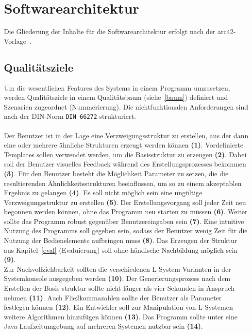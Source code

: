 \section{Softwarearchitektur}
Die Gliederung der Inhalte für die Softwarearchitektur erfolgt nach der arc42-Vorlage~\cite{arc42}.

\subsection*{Qualitätsziele}
Um die wesentlichen Features des Systems in einem Programm umzusetzen, werden Qualitätsziele in einem Qualitätsbaum
(siehe~\ref{baum}) definiert und Szenarien zugeordnet (Nummerierung).
Die nichtfunktionalen Anforderungen sind nach der DIN-Norm \texttt{DIN 66272} strukturiert.\\~\\
Der Benutzer ist in der Lage eine Verzweigungsstruktur zu erstellen, aus der dann eine oder mehrere ähnliche Strukturen
erzeugt werden können \textbf{(1)}.
Vordefinierte Templates sollen verwendet werden, um die Basisstruktur zu erzeugen \textbf{(2)}.
Dabei soll der Benutzer visuelles Feedback während des Erstellungsprozesses bekommen \textbf{(3)}.
Für den Benutzer besteht die Möglichkeit Parameter zu setzen, die die resultierenden Ähnlichkeitsstrukturen beeinflussen,
um so zu einem akzeptablen Ergebnis zu gelangen \textbf{(4)}.
Es soll nicht möglich sein eine ungültige Verzweigungsstruktur zu erstellen \textbf{(5)}.
Der Erstellungsvorgang soll jeder Zeit neu begonnen werden können, ohne das Programm neu starten zu müssen \textbf{(6)}.
Weiter sollte das Programm robust gegenüber Benutzereingaben sein \textbf{(7)}.
Eine intuitive Nutzung des Programms soll gegeben sein, sodass der Benutzer wenig Zeit für die Nutzung der Bedienelemente
aufbringen muss \textbf{(8)}.
Das Erzeugen der Struktur aus Kapitel~\ref{eval} (Evaluierung) soll ohne händische Nachbildung möglich sein \textbf{(9)}.\\
Zur Nachvollziehbarkeit sollten die verschiedenen L-System-Varianten in der Systemkonsole ausgegeben werden \textbf{(10)}.
Der Generierungsprozess nach dem Erstellen der Basis-struktur sollte nicht länger als vier Sekunden in Anspruch nehmen \textbf{(11)}.
Auch Fließkommazahlen sollte der Benutzer als Parameter festlegen können \textbf{(12)}.
Ein Entwickler soll zur Manipulation von L-Systemen weitere Algorithmen hinzufügen können \textbf{(13)}.
Das Programm sollte unter eine Java-Laufzeitumgebung auf mehreren Systemen nutzbar sein \textbf{(14)}.

